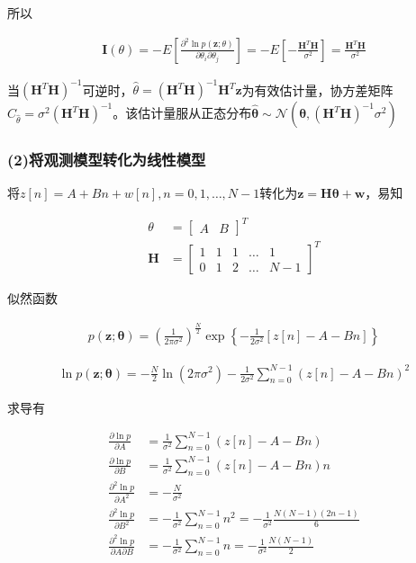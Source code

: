 \documentclass[fontset=windows]{article}
\numberwithin{figure}{section}
\begin{document}
所以

\begin{align*}
	\mathbf{I}(\theta)=
	-E\left[\frac{\partial^2 \ln p(\mathbf{z};\theta)}{\partial \theta_i \partial \theta_j}\right]
	=-E\left[-\frac{\mathbf{H}^T\mathbf{H}}{\sigma^2}\right]
	=\frac{\mathbf{H}^T\mathbf{H}}{\sigma^2}
\end{align*}

当\((\boldsymbol{H}^T\boldsymbol{H})^{-1}\)可逆时，\(\hat{\theta}=(\boldsymbol{H}^T\boldsymbol{H})^{-1}\boldsymbol{H}^T\mathbf{z}\)为有效估计量，协方差矩阵\(C_{\hat{\theta}}=\sigma^2(\boldsymbol{H}^T\boldsymbol{H})^{-1}\)。该估计量服从正态分布\(\hat{\boldsymbol{\theta}} \sim \mathcal{N} (\boldsymbol{\theta},\left(\mathbf{H}^T\mathbf{H}\right)^{-1}\sigma^2)\)

\subsubsection*{(2)将观测模型转化为线性模型}

将\(z[n]=A+Bn+w[n],n=0,1,…,N-1\)转化为\(\mathbf{z}=\mathbf{H}\boldsymbol{\theta}+\mathbf{w}\)，易知

\begin{align*}
	\theta     & =
	\begin{bmatrix}
		A & B
	\end{bmatrix}^T \\
	\mathbf{H} & =
	\begin{bmatrix}
		1 & 1 & 1 & … & 1   \\
		0 & 1 & 2 & … & N-1
	\end{bmatrix}^T
\end{align*}

似然函数

\begin{align*}
	p(\mathbf{z};\boldsymbol{\theta})=(\frac{1}{2\pi \sigma^2})^{\frac{N}{2}}
	\exp\left\{-\frac{1}{2\sigma^2}\left[z[n]-A-Bn\right]\right\}
\end{align*}

\begin{align*}
	\ln p(\mathbf{z};\boldsymbol{\theta})=-{\frac{N}{2}}\ln (2\pi \sigma^2)
	-\frac{1}{2\sigma^2}\sum_{n=0}^{N-1}\left(z[n]-A-Bn\right)^2
\end{align*}

求导有

\begin{align*}
	\frac{\partial \ln p}{\partial A}
	 & =\frac{1}{\sigma^2}\sum_{n=0}^{N-1}\left(z[n]-A-Bn\right)  \\
	\frac{\partial \ln p}{\partial B}
	 & =\frac{1}{\sigma^2}\sum_{n=0}^{N-1}\left(z[n]-A-Bn\right)n \\
	\frac{\partial^2 \ln p}{\partial A^2}
	 & =-\frac{N}{\sigma^2}                                       \\
	\frac{\partial^2 \ln p}{\partial B^2}
	 & =-\frac{1}{\sigma^2}\sum_{n=0}^{N-1}n^2
	=-\frac{1}{\sigma^2}\frac{N(N-1)(2n-1)}{6}                    \\
	\frac{\partial^2 \ln p}{\partial A \partial B}
	 & =-\frac{1}{\sigma^2}\sum_{n=0}^{N-1}n
	=-\frac{1}{\sigma^2}\frac{N(N-1)}{2}
\end{align*}
\end{document}
